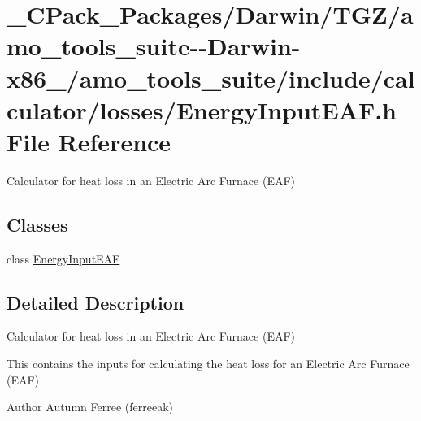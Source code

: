\hypertarget{___c_pack___packages_2_darwin_2_t_g_z_2amo__tools__suite--_darwin-x86__64_2amo__tools__suite_2in02bd3a281dd0d370484fbb9e4f9c9b85}{}\section{\+\_\+\+C\+Pack\+\_\+\+Packages/\+Darwin/\+T\+G\+Z/amo\+\_\+tools\+\_\+suite-\/-\/\+Darwin-\/x86\+\_/amo\+\_\+tools\+\_\+suite/include/calculator/losses/\+Energy\+Input\+E\+AF.h File Reference}
\label{___c_pack___packages_2_darwin_2_t_g_z_2amo__tools__suite--_darwin-x86__64_2amo__tools__suite_2in02bd3a281dd0d370484fbb9e4f9c9b85}


Calculator for heat loss in an Electric Arc Furnace (E\+AF)  


\subsection*{Classes}
\begin{DoxyCompactItemize}
\item 
class \hyperlink{class_energy_input_e_a_f}{Energy\+Input\+E\+AF}
\end{DoxyCompactItemize}


\subsection{Detailed Description}
Calculator for heat loss in an Electric Arc Furnace (E\+AF) 

This contains the inputs for calculating the heat loss for an Electric Arc Furnace (E\+AF)

\begin{DoxyAuthor}{Author}
Autumn Ferree (ferreeak) 
\end{DoxyAuthor}

